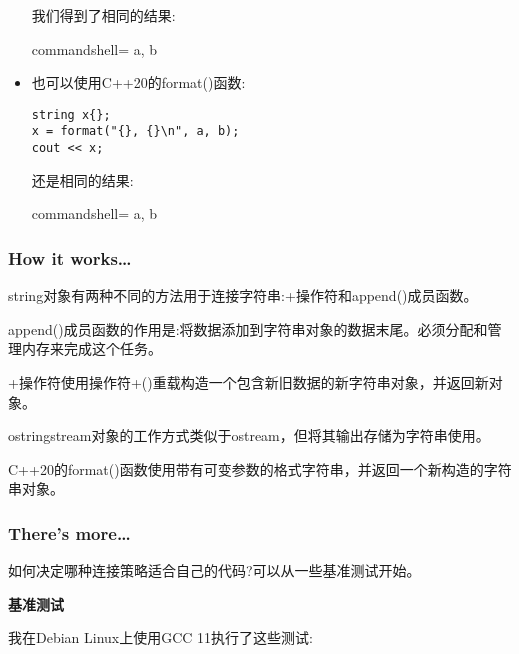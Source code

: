 \begin{itemize}
我们得到了相同的结果:

\begin{tcblisting}{commandshell={}}
a, b
\end{tcblisting}

\item 
也可以使用C++20的format()函数:

\begin{lstlisting}[style=styleCXX]
string x{};
x = format("{}, {}\n", a, b);
cout << x;
\end{lstlisting}

还是相同的结果:

\begin{tcblisting}{commandshell={}}
a, b
\end{tcblisting}

\end{itemize}

\subsubsection{How it works…}

string对象有两种不同的方法用于连接字符串:+操作符和append()成员函数。

append()成员函数的作用是:将数据添加到字符串对象的数据末尾。必须分配和管理内存来完成这个任务。

+操作符使用操作符+()重载构造一个包含新旧数据的新字符串对象，并返回新对象。

ostringstream对象的工作方式类似于ostream，但将其输出存储为字符串使用。

C++20的format()函数使用带有可变参数的格式字符串，并返回一个新构造的字符串对象。

\subsubsection{There's more…}

如何决定哪种连接策略适合自己的代码?可以从一些基准测试开始。

\noindent
\textbf{基准测试}

我在Debian Linux上使用GCC 11执行了这些测试:

